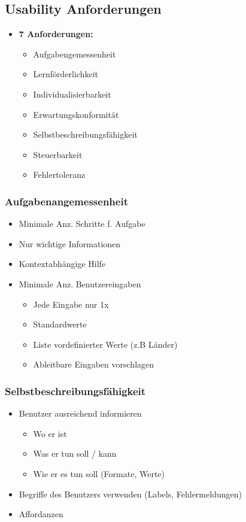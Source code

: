 \documentclass[../ZF_SWEN1.tex]{subfiles}
\begin{document}
\subsection{Usability Anforderungen}

\begin{itemize}
	\item \textbf{7 Anforderungen:}
	\begin{itemize}
		\item Aufgabengemessenheit
		\item Lernförderlichkeit
		\item Individualisierbarkeit
		\item Erwartungskonformität
		\item Selbstbeschreibungsfähigkeit
		\item Steuerbarkeit
		\item Fehlertoleranz
	\end{itemize}
\end{itemize}


\subsubsection{Aufgabenangemessenheit}
\begin{itemize}
	\item Minimale Anz. Schritte f. Aufgabe
	\item Nur wichtige Informationen
	\item Kontextabhängige Hilfe
	\item Minimale Anz. Benutzereingaben
	\begin{itemize}
		\item Jede Eingabe nur 1x
		\item Standardwerte
		\item Liste vordefinierter Werte (z.B Länder)
		\item Ableitbare Eingaben vorschlagen
	\end{itemize}
\end{itemize}

\subsubsection{Selbstbeschreibungsfähigkeit}
\begin{itemize}
	\item Benutzer ausreichend informieren

	\begin{itemize}
		\item Wo er ist
		\item Was er tun soll / kann
		\item Wie er es tun soll (Formate, Werte)
	\end{itemize}
	
	\item Begriffe des Benutzers verwenden (Labels, Fehlermeldungen)
	\item Affordanzen

\end{itemize}
\end{document}
